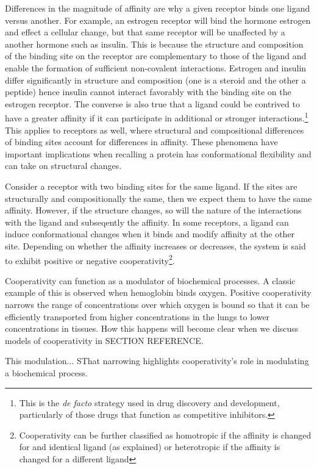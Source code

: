 \documentclass{article}
\numberwithin{equation}{section}
\begin{document}
Differences in the magnitude of affinity are why a given receptor binds one ligand versus another. For example, an estrogen receptor will bind the hormone estrogen and effect a cellular change, but that same receptor will be unaffected by a another hormone such as insulin. This is because the structure and composition of the binding site on the receptor are complementary to those of the ligand and enable the formation of sufficient non-covalent interactions. Estrogen and insulin differ significantly in structure and composition (one is a steroid and the other a peptide) hence insulin cannot interact favorably with the binding site on the estrogen receptor. The converse is also true that a ligand could be contrived to have a greater affinity if it can participate in additional or stronger interactions.\footnote{This is the \emph{de facto} strategy used in drug discovery and development, particularly of those drugs that function as competitive inhibitors.} This applies to receptors as well, where structural and compositional differences of binding sites account for differences in affinity. These phenomena have important implications when recalling a protein has conformational flexibility and can take on structural changes.

Consider a receptor with two binding sites for the same ligand. If the sites are structurally and compositionally the same, then we expect them to have the same affinity. However, if the structure changes, so will the nature of the interactions with the ligand and subseqently the affinity. In some receptors, a ligand can induce conformational changes when it binds and modify affinity at the other site. Depending on whether the affinity increases or decreases, the system is said to exhibit positive or negative cooperativity\footnote{Cooperativity can be further classified as homotropic if the affinity is changed for and identical ligand (as explained) or heterotropic if the affinity is changed for a different ligand}. 

Cooperativity can function as a modulator of biochemical processes. A classic example of this is observed when hemoglobin binds oxygen. Positive cooperativity narrows the range of concentrations over which oxygen is bound so that it can be efficiently transported from higher concentrations in the lungs to lower concentrations in tissues. How this happens will become clear when we discuss models of cooperativity in SECTION REFERENCE.



This modulation... SThat narrowing highlights cooperativity's role in modulating a biochemical process.
\end{document}
